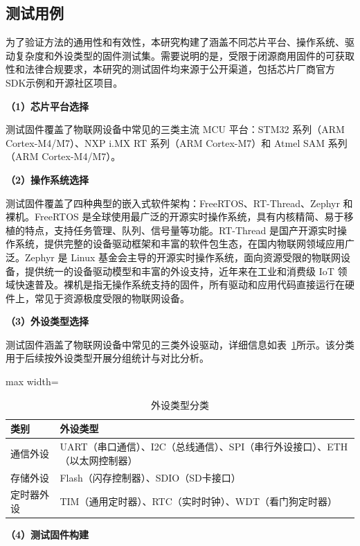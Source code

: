 \subsection{测试用例}

为了验证方法的通用性和有效性，本研究构建了涵盖不同芯片平台、操作系统、驱动复杂度和外设类型的固件测试集。需要说明的是，受限于闭源商用固件的可获取性和法律合规要求，本研究的测试固件均来源于公开渠道，包括芯片厂商官方SDK示例和开源社区项目。

\textbf{（1）芯片平台选择}

测试固件覆盖了物联网设备中常见的三类主流 MCU 平台：STM32 系列（ARM Cortex-M4/M7）、NXP i.MX RT 系列（ARM Cortex-M7）和 Atmel SAM 系列（ARM Cortex-M4/M7）。

\textbf{（2）操作系统选择}

测试固件覆盖了四种典型的嵌入式软件架构：FreeRTOS、RT-Thread、Zephyr 和裸机。FreeRTOS 是全球使用最广泛的开源实时操作系统，具有内核精简、易于移植的特点，支持任务管理、队列、信号量等功能。RT-Thread 是国产开源实时操作系统，提供完整的设备驱动框架和丰富的软件包生态，在国内物联网领域应用广泛。Zephyr 是 Linux 基金会主导的开源实时操作系统，面向资源受限的物联网设备，提供统一的设备驱动模型和丰富的外设支持，近年来在工业和消费级 IoT 领域快速普及。裸机是指无操作系统支持的固件，所有驱动和应用代码直接运行在硬件上，常见于资源极度受限的物联网设备。

\textbf{（3）外设类型选择}

测试固件涵盖了物联网设备中常见的三类外设驱动，详细信息如表~\ref{tab:peripherals}所示。该分类用于后续按外设类型开展分组统计与对比分析。

\begin{table}[htbp]
\centering
\caption{外设类型分类}
\label{tab:peripherals}
\begin{adjustbox}{max width=\textwidth}
\begin{tabular}{ll}
\toprule
\textbf{类别} & \textbf{外设类型} \\
\midrule
通信外设 & UART（串口通信）、I2C（总线通信）、SPI（串行外设接口）、ETH（以太网控制器） \\
存储外设 & Flash（闪存控制器）、SDIO（SD卡接口） \\
定时器外设 & TIM（通用定时器）、RTC（实时时钟）、WDT（看门狗定时器） \\
\bottomrule
\end{tabular}
\end{adjustbox}
\end{table}

\textbf{（4）测试固件构建}

